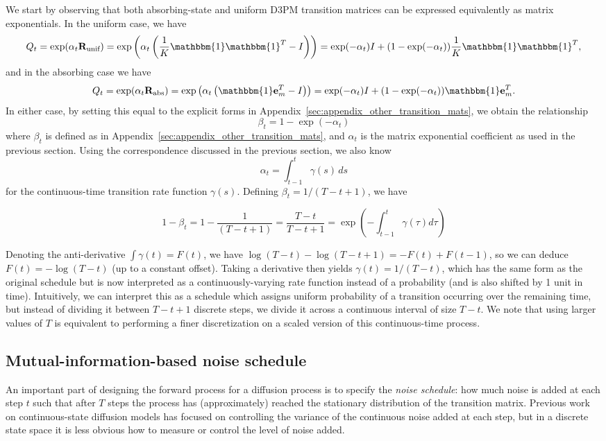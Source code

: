 We start by observing that both absorbing-state and uniform D3PM transition matrices can be expressed equivalently as matrix exponentials. In the uniform case, we have
\[
Q_t = \exp(\alpha_t \mathbf{R}_\text{unif})=
\exp\left(\alpha_t \left(\frac{1}{K}\mathbbm{1} \mathbbm{1}^T - I\right)\right)=
\exp(-\alpha_t) I + (1 - \exp(-\alpha_t))\frac{1}{K}\mathbbm{1} \mathbbm{1}^T,
\]
and in the absorbing case we have
\[
Q_t = \exp(\alpha_t \mathbf{R}_\text{abs})=
\exp\left(\alpha_t \left(\mathbbm{1} \mathbf{e}_m^T - I \right)\right)=
\exp(-\alpha_t) I + (1 - \exp(-\alpha_t))\mathbbm{1} \mathbf{e}_m^T.
\]
In either case, by setting this equal to the explicit forms in Appendix~\ref{sec:appendix_other_transition_mats}, we obtain the relationship
\[
\beta_t = 1 - \exp(-\alpha_t)
\]
where $\beta_t$ is defined as in Appendix~\ref{sec:appendix_other_transition_mats}, and $\alpha_t$ is the matrix exponential coefficient as used in the previous section.
Using the correspondence discussed in the previous section, we also know
\[
\alpha_t = \int_{t-1}^t \gamma(s)\,ds
\]
for the continuous-time transition rate function $\gamma(s)$. Defining $\beta_t = 1/(T - t + 1)$, we have

$$1 - \beta_t = 1 - \frac{1}{(T - t + 1)} = \frac{T - t}{T - t + 1} = \exp\left(-\int_{t-1}^{t} \gamma(\tau) d\tau\right)$$

Denoting the anti-derivative $\int \gamma(t) = F(t)$, we have $\log(T - t) - \log(T - t + 1) = - F(t) + F(t-1)$, so we can deduce $F(t) = -\log(T - t)$ (up to a constant offset). Taking a derivative then yields $\gamma(t) = 1 / (T - t)$, which has the same form as the original schedule but is now interpreted as a continuously-varying rate function instead of a probability (and is also shifted by 1 unit in time). Intuitively, we can interpret this as a schedule which assigns uniform probability of a transition occurring over the remaining time, but instead of dividing it between $T-t+1$ discrete steps, we divide it across a continuous interval of size $T-t$. We note that using larger values of $T$ is equivalent to performing a finer discretization on a scaled version of this continuous-time process.

\subsection{Mutual-information-based noise schedule}\label{sec:appendix_noise_schedule}
An important part of designing the forward process for a diffusion process is to specify the \emph{noise schedule}: how much noise is added at each step $t$ such that after $T$ steps the process has (approximately) reached the stationary distribution of the transition matrix. Previous work on continuous-state diffusion models \citep{ho2020denoising, nichol2021improved, song2020_sde} has focused on controlling the variance of the continuous noise added at each step, but in a discrete state space it is less obvious how to measure or control the level of noise added.

